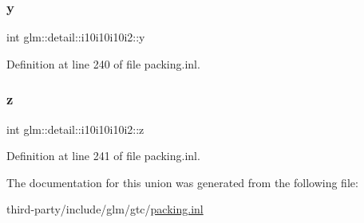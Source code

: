 \mbox{\label{unionglm_1_1detail_1_1i10i10i10i2_ae76bb89adeb66d1ee5bb2b265e87fc1b}} 
\subsubsection{\texorpdfstring{y}{y}}
{\footnotesize\ttfamily int glm\+::detail\+::i10i10i10i2\+::y}



Definition at line 240 of file packing.\+inl.

\mbox{\label{unionglm_1_1detail_1_1i10i10i10i2_a95398090414de32eaaf9cb3c3bd3fa48}} 
\subsubsection{\texorpdfstring{z}{z}}
{\footnotesize\ttfamily int glm\+::detail\+::i10i10i10i2\+::z}



Definition at line 241 of file packing.\+inl.



The documentation for this union was generated from the following file\+:\begin{DoxyCompactItemize}
\item 
third-\/party/include/glm/gtc/\hyperlink{packing_8inl}{packing.\+inl}\end{DoxyCompactItemize}

